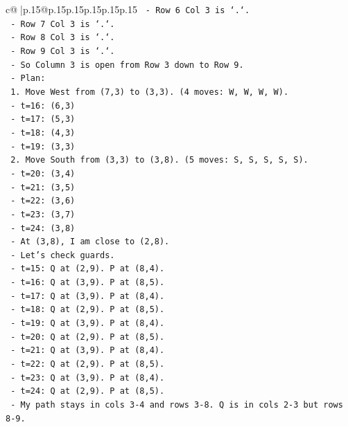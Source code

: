 \documentclass{article}
\begin{document}
{\begin{supertabular}{c@{$\;$}|p{.15\linewidth}@{}p{.15\linewidth}p{.15\linewidth}p{.15\linewidth}p{.15\linewidth}p{.15\linewidth}}
{{{\texttt{    {-} Row 6 Col 3 is `.`.} \\
\texttt{    {-} Row 7 Col 3 is `.`.} \\
\texttt{    {-} Row 8 Col 3 is `.`.} \\
\texttt{    {-} Row 9 Col 3 is `.`.} \\
\texttt{    {-} So Column 3 is open from Row 3 down to Row 9.} \\
\texttt{  {-} Plan:} \\
\texttt{    1. Move West from (7,3) to (3,3). (4 moves: W, W, W, W).} \\
\texttt{       {-} t=16: (6,3)} \\
\texttt{       {-} t=17: (5,3)} \\
\texttt{       {-} t=18: (4,3)} \\
\texttt{       {-} t=19: (3,3)} \\
\texttt{    2. Move South from (3,3) to (3,8). (5 moves: S, S, S, S, S).} \\
\texttt{       {-} t=20: (3,4)} \\
\texttt{       {-} t=21: (3,5)} \\
\texttt{       {-} t=22: (3,6)} \\
\texttt{       {-} t=23: (3,7)} \\
\texttt{       {-} t=24: (3,8)} \\
\texttt{    {-} At (3,8), I am close to (2,8).} \\
\texttt{    {-} Let's check guards.} \\
\texttt{      {-} t=15: Q at (2,9). P at (8,4).} \\
\texttt{      {-} t=16: Q at (3,9). P at (8,5).} \\
\texttt{      {-} t=17: Q at (3,9). P at (8,4).} \\
\texttt{      {-} t=18: Q at (2,9). P at (8,5).} \\
\texttt{      {-} t=19: Q at (3,9). P at (8,4).} \\
\texttt{      {-} t=20: Q at (2,9). P at (8,5).} \\
\texttt{      {-} t=21: Q at (3,9). P at (8,4).} \\
\texttt{      {-} t=22: Q at (2,9). P at (8,5).} \\
\texttt{      {-} t=23: Q at (3,9). P at (8,4).} \\
\texttt{      {-} t=24: Q at (2,9). P at (8,5).} \\
\texttt{      {-} My path stays in cols 3{-}4 and rows 3{-}8. Q is in cols 2{-}3 but rows 8{-}9.} \\
}}}
\end{supertabular}}
\end{document}
